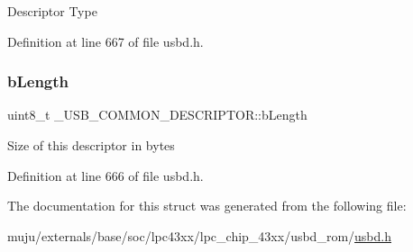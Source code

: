 Descriptor Type 

Definition at line 667 of file usbd.\+h.

\mbox{\label{struct___u_s_b___c_o_m_m_o_n___d_e_s_c_r_i_p_t_o_r_a3b232c5c49b059c8df010496ca69868b}} 
\subsubsection{\texorpdfstring{b\+Length}{bLength}}
{\footnotesize\ttfamily uint8\+\_\+t \+\_\+\+U\+S\+B\+\_\+\+C\+O\+M\+M\+O\+N\+\_\+\+D\+E\+S\+C\+R\+I\+P\+T\+O\+R\+::b\+Length}

Size of this descriptor in bytes 

Definition at line 666 of file usbd.\+h.



The documentation for this struct was generated from the following file\+:\begin{DoxyCompactItemize}
\item 
muju/externals/base/soc/lpc43xx/lpc\+\_\+chip\+\_\+43xx/usbd\+\_\+rom/\hyperlink{usbd_8h}{usbd.\+h}\end{DoxyCompactItemize}
